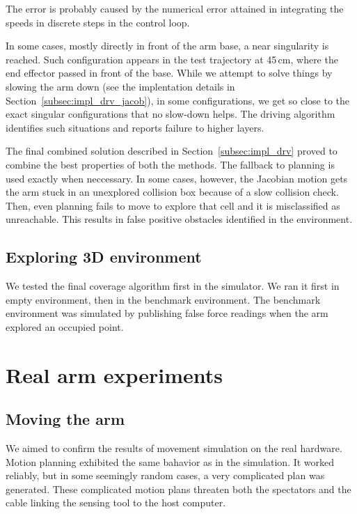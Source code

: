 \documentclass[buriama8_dp.tex]{subfiles}
\begin{document}
The error is probably caused by the numerical error attained in integrating the speeds in discrete steps in the control loop.

In some cases, mostly directly in front of the arm base, a near singularity is reached. Such configuration appears in the test trajectory at 45\,cm, where the end effector passed in front of the base. While we attempt to solve things by slowing the arm down (see the implentation details in Section~\ref{subsec:impl_drv_jacob}), in some configurations, we get so close to the exact singular configurations that no slow-down helps. The driving algorithm identifies such situations and reports failure to higher layers.

The final combined solution described in Section~\ref{subsec:impl_drv} proved to combine the best properties of both the methods. The fallback to planning is used exactly when neccessary. In some cases, however, the Jacobian motion gets the arm stuck in an unexplored collision box because of a slow collision check. Then, even planning fails to move to explore that cell and it is misclassified as unreachable. This results in false positive obstacles identified in the environment.

\subsection{Exploring 3D environment}
\label{subsec:sim_arm_cover}

We tested the final coverage algorithm first in the simulator. We ran it first in empty environment, then in the benchmark environment. The benchmark environment was simulated by publishing false force readings when the arm explored an occupied point.




\section{Real arm experiments}
\label{sec:exp_real_arm}

\subsection{Moving the arm}
\label{subsec:label}

We aimed to confirm the results of movement simulation on the real hardware. Motion planning exhibited the same bahavior as in the simulation. It worked reliably, but in some seemingly random cases, a very complicated plan was generated. These complicated motion plans threaten both the spectators and the cable linking the sensing tool to the host computer.
\end{document}
